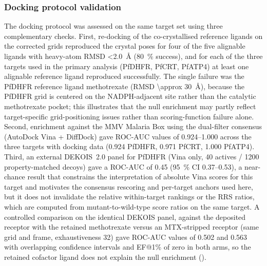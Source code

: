\documentclass[journal=jcisd8,manuscript=article]{achemso}
\begin{document}
\subsubsection{Docking protocol validation}\label{sec:methods_dock_val}
The docking protocol was assessed on the same target set using three complementary checks. First, re-docking of the co-crystallised reference ligands on the corrected grids reproduced the crystal poses for four of the five alignable ligands with heavy-atom RMSD \qty{<2.0}{\angstrom} (\qty{80}{\percent} success), and for each of the three targets used in the primary analysis (PfDHFR, PfCRT, PfATP4) at least one alignable reference ligand reproduced successfully. The single failure was the PfDHFR reference ligand methotrexate (RMSD \qty{\approx 30}{\angstrom}), because the PfDHFR grid is centered on the NADPH-adjacent site rather than the catalytic methotrexate pocket; this illustrates that the null enrichment may partly reflect target-specific grid-positioning issues rather than scoring-function failure alone. Second, enrichment against the MMV Malaria Box using the dual-filter consensus (AutoDock Vina + DiffDock) gave ROC-AUC values of \numrange{0.924}{1.000} across the three targets with docking data (\num{0.924} PfDHFR, \num{0.971} PfCRT, \num{1.000} PfATP4). Third, an external DEKOIS~2.0 panel for PfDHFR (Vina only, \num{40} actives / \num{1200} property-matched decoys) gave a ROC-AUC of \num{0.45} (\qty{95}{\percent} CI \numrange{0.37}{0.53}), a near-chance result that constrains the interpretation of absolute Vina scores for this target and motivates the consensus rescoring and per-target anchors used here, but it does not invalidate the relative within-target rankings or the RRS ratios, which are computed from mutant-to-wild-type score ratios on the same target. A controlled comparison on the identical DEKOIS panel, against the deposited receptor with the retained methotrexate versus an MTX-stripped receptor (same grid and frame, exhaustiveness \num{32}) gave ROC-AUC values of \num{0.502} and \num{0.563} with overlapping confidence intervals and EF@1\% of zero in both arms, so the retained cofactor ligand does not explain the null enrichment ().
\end{document}
